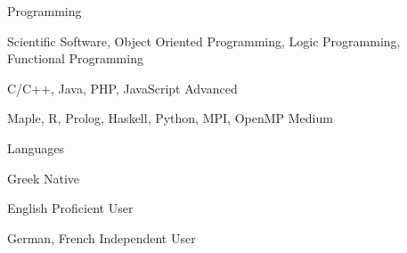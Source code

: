 

\begin{cvskills}


  \cvskill
    {Programming} %
    {
	   	\begin{cvitems}
	   		\item {Scientific Software, Object Oriented Programming, Logic Programming, Functional Programming}
	   		\item {C/C++, Java, PHP, JavaScript {\enskip\cdotp\enskip} Advanced}
	   		\item {Maple, R, Prolog, Haskell, Python, MPI, OpenMP {\enskip\cdotp\enskip} Medium}
	 	\end{cvitems}
} %

  \cvskill
    {Languages} %
    {
    	\begin{cvitems}
    		\item {Greek {\enskip\cdotp\enskip} Native}
    		\item {English {\enskip\cdotp\enskip} Proficient User}
    		\item {German, French {\enskip\cdotp\enskip} Independent User}
    	\end{cvitems}
    } %

\end{cvskills}
